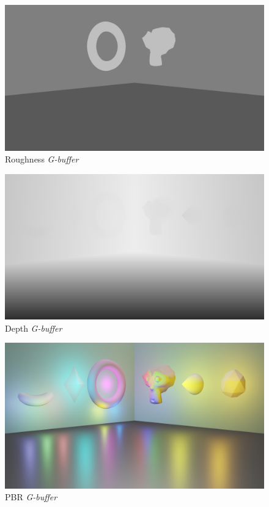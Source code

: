 \documentclass[11pt,a4paper]{report}
\begin{document}
\begin{figure}[htp]
	\centering
	\includegraphics[width=\textwidth]{deferred/04roughness.png}
	\caption{Roughness \textit{G-buffer}}
	\label{deferred:roughness}
\end{figure}

\begin{figure}[htp]
	\centering
	\includegraphics[width=\textwidth]{deferred/05depth.png}
	\caption{Depth \textit{G-buffer}}
	\label{deferred:depth}
\end{figure}

\begin{figure}[htp]
	\centering
	\includegraphics[width=\textwidth]{deferred/06pbr.png}
	\caption{PBR \textit{G-buffer}}
	\label{deferred:pbr}
\end{figure}
\end{document}

